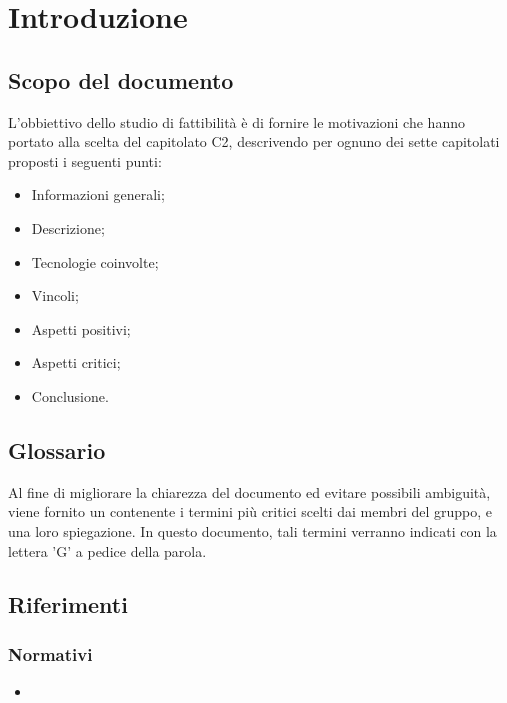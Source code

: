 \section{Introduzione}

\subsection{Scopo del documento}
L'obbiettivo dello studio di fattibilità è di fornire le motivazioni che hanno portato alla scelta del capitolato C2, descrivendo per ognuno dei sette capitolati proposti i seguenti punti:
\begin{itemize}
\item Informazioni generali;
\item Descrizione;
\item Tecnologie coinvolte;
\item Vincoli;
\item Aspetti positivi;
\item Aspetti critici;
\item Conclusione.
\end{itemize}

\subsection{Glossario}
Al fine di migliorare la chiarezza del documento ed evitare possibili ambiguità, viene fornito un \Glossario{} contenente i termini più critici scelti dai membri del gruppo, e una loro spiegazione. In questo documento, tali termini verranno indicati con la lettera 'G' a pedice della parola. 

\subsection{Riferimenti}
\subsubsection{Normativi}
\begin{itemize}
\item {}
\end{itemize}
\sloppy
